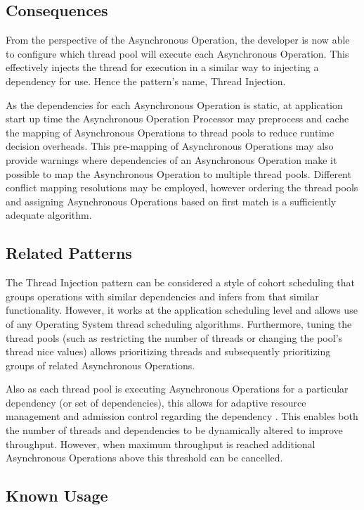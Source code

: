 \documentclass[prodmode]{style/acmlarge}
\begin{document}
\subsection{Consequences}

From the perspective of the Asynchronous Operation, the developer is now able to
configure which thread pool will execute each Asynchronous Operation.  This
effectively injects the thread for execution in a similar way to injecting a
dependency for use.  Hence the pattern's name, Thread Injection.

As the dependencies for each Asynchronous Operation is static, at application
start up time the Asynchronous Operation Processor may preprocess and cache the
mapping of Asynchronous Operations to thread pools to reduce runtime decision
overheads.  This pre-mapping of Asynchronous Operations may also provide
warnings where dependencies of an Asynchronous Operation make it possible to map
the Asynchronous Operation to multiple thread pools.  Different conflict
mapping resolutions may be employed, however ordering the thread pools and
assigning Asynchronous Operations based on first match is a sufficiently
adequate algorithm.


\subsection{Related Patterns}

The Thread Injection pattern can be considered a style of cohort scheduling
\cite{cohort} that groups operations with similar dependencies and infers from
that similar functionality.  However, it works at the application scheduling
level and allows use of any Operating System thread scheduling algorithms. 
Furthermore, tuning the thread pools (such as restricting the number of threads
or changing the pool's thread nice values) allows prioritizing threads and
subsequently prioritizing groups of related Asynchronous Operations.

Also as each thread pool is executing Asynchronous Operations for a particular
dependency (or set of dependencies), this allows for adaptive resource
management and admission control regarding the dependency \cite{seda}.  This
enables both the number of threads and dependencies to be dynamically altered to
improve throughput.  However, when maximum throughput is reached additional
Asynchronous Operations above this threshold can be cancelled.


\subsection{Known Usage}
\end{document}
